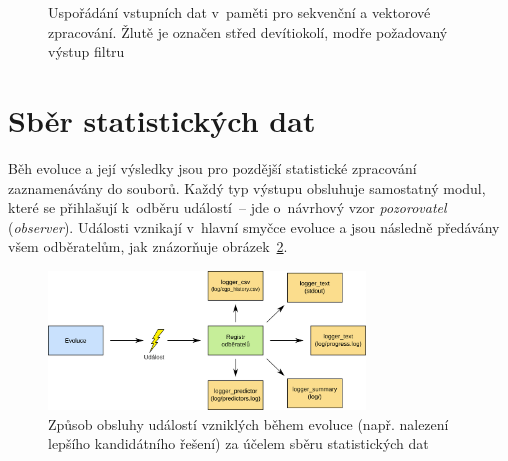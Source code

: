 \begin{figure}[htb]
    \centering
    \baselineskip
    \baselineskip
    \caption{Uspořádání vstupních dat v~paměti pro sekvenční a vektorové zpracování. Žlutě je označen střed devítiokolí, modře požadovaný výstup filtru}
    \label{obrDevitiokoli}
\end{figure}


\section{Sběr statistických dat}
\label{secImplExperimental}

Běh evoluce a její výsledky jsou pro pozdější statistické zpracování zaznamenávány do souborů. Každý typ výstupu obsluhuje samostatný modul, které se přihlašují k~odběru událostí~-- jde o~návrhový vzor \emph{pozorovatel} (\emph{observer}). Události vznikají v~hlavní smyčce evoluce a jsou následně předávány všem odběratelům, jak znázorňuje obrázek~\ref{obrLoggersHandling}.

\begin{figure}[b]
    \centering
    \includegraphics[width=0.75\textwidth]{fig/loggerevent}
    \caption{Způsob obsluhy událostí vzniklých během evoluce (např. nalezení lepšího kandidátního řešení) za účelem sběru statistických dat}
    \label{obrLoggersHandling}
\end{figure}


